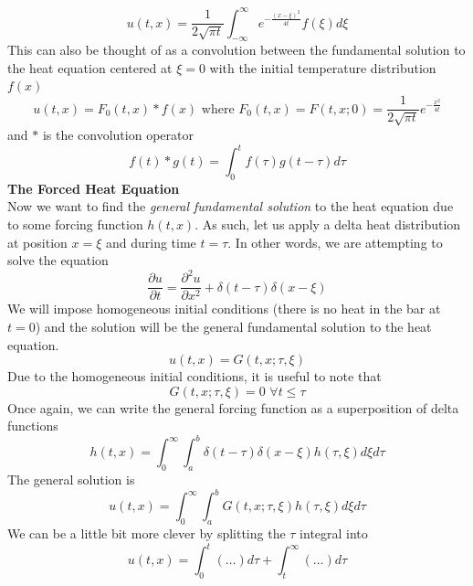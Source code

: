 \documentclass{article}
\newcommand{\pd}[2]{\frac{\partial #1}{\partial #2}}
\newcommand{\pdt}[2]{\frac{\partial ^2 #1}{\partial #2 ^2}}
\newcommand{\pull}{\! \! \!}
\newcommand{\gfsh}{G(t,x;\tau,\xi)}
\numberwithin{equation}{section}
\begin{document}
\begin{equation}
    u(t,x) =\frac{1}{2\sqrt{\pi t}}\int^\infty_{-\infty} e^{-\frac{(x-\xi)^2}{4t}}f(\xi)d\xi
\end{equation}
This can also be thought of as a convolution between the fundamental solution to the heat equation centered at $\xi =0$ with the initial temperature distribution $f(x)$
\begin{equation}
    u(t,x) =F_0(t,x) *f(x) \text{ where } F_0(t,x)=F(t,x;0) = \frac{1}{2\sqrt{\pi t}}e^{-\frac{x^2}{4t}}
\end{equation}
and $*$ is the convolution operator 
\begin{equation*}
    f(t)*g(t) =\int_0^tf(\tau)g(t-\tau)d\tau
\end{equation*}
\textbf{The Forced Heat Equation} \\
Now we want to find the \textit{general fundamental solution} to the heat equation due to some forcing function $h(t,x)$. As such, let us apply a delta heat distribution at position $x=\xi$ and during time $t=\tau$. In other words, we are attempting to solve the equation
\begin{equation*}
    \pd{u}{t} = \pdt{u}{x} +\delta(t-\tau)\delta(x-\xi)
\end{equation*}
We will impose homogeneous initial conditions (there is no heat in the bar at $t=0$) and the solution will be the general fundamental solution to the heat equation.
\begin{equation*}
    u(t,x) = \gfsh
\end{equation*}
Due to the homogeneous initial conditions, it is useful to note that 
\begin{equation}
    \gfsh =0 \hspace{4pt} \forall t\leq \tau \label{eq:3.10}
\end{equation}
Once again, we can write the general forcing function as a superposition of delta functions 
\begin{equation}
h(t,x) =\int^\infty_0 \pull \int^b_a\delta (t-\tau)\delta(x-\xi)h(\tau,\xi) d\xi d\tau
\end{equation}
The general solution is 
\begin{equation*}
    u(t,x) = \int_0^\infty\pull \int^b_a \gfsh h(\tau, \xi)d\xi d\tau 
\end{equation*}
We can be a little bit more clever by splitting the $\tau$ integral into 
\begin{equation*}
    u(t,x) = \int^t_0(\ldots)d\tau +\int_t^\infty(\ldots)d\tau
\end{equation*}
\end{document}
